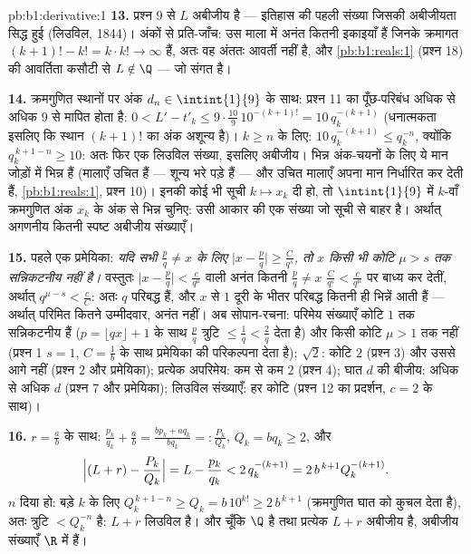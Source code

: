 \begin{solution}{pb:b1:derivative:1}
\textbf{13.} प्रश्न 9 से $L$ अबीजीय है --- इतिहास की पहली संख्या जिसकी
अबीजीयता सिद्ध हुई (लिउविल, 1844)। अंकों से प्रति-जाँच: उस माला में अनंत
कितनी इकाइयाँ हैं जिनके क्रमागत  $(k+1)! - k! = k\cdot k! \to \infty$
हैं, अतः वह अंततः आवर्ती नहीं है, और \cref{pb:b1:reals:1} (प्रश्न 18) की
आवर्तिता कसौटी से $L \notin \Q$ --- जो संगत है।

\textbf{14.} क्रमगुणित स्थानों पर अंक $d_n \in \intint{1}{9}$ के साथ: प्रश्न
11 का पूँछ-परिबंध अधिक से अधिक $9$ से मापित होता है: $0 < L' - t'_k \leq
9\cdot\frac{10}{9}\,10^{-(k+1)!} = 10\,q_k^{-(k+1)}$ (धनात्मकता इसलिए कि
स्थान $(k+1)!$ का अंक अशून्य है)। $k \geq n$ के लिए: $10\,q_k^{-(k+1)} \leq
q_k^{-n}$, क्योंकि $q_k^{\,k+1-n} \geq 10$: अतः फिर एक लिउविल संख्या, इसलिए
अबीजीय। भिन्न अंक-चयनों के लिए ये मान जोड़ों में भिन्न हैं (मालाएँ उचित हैं
--- शून्य भरे पड़े हैं --- और उचित मालाएँ अपना मान निर्धारित कर देती हैं,
\cref{pb:b1:reals:1}, प्रश्न 10)। इनकी कोई भी सूची $k \mapsto x_k$ दी हो, तो
$\intint{1}{9}$ में $k$-वाँ क्रमगुणित अंक $x_k$ के अंक से भिन्न चुनिए: उसी
आकार की एक संख्या जो सूची से बाहर है। अर्थात् अगणनीय कितनी स्पष्ट अबीजीय
संख्याएँ।

\textbf{15.} पहले एक प्रमेयिका: \emph{यदि सभी $\frac pq \neq x$ के लिए
$\bigl|x - \frac pq\bigr| \geq \frac{C}{q^s}$, तो $x$ किसी भी कोटि $\mu > s$
तक सन्निकटनीय नहीं है।} वस्तुतः $\bigl|x - \frac pq\bigr| < \frac{c}{q^\mu}$
वाली अनंत कितनी $\frac pq \neq x$ $\frac{C}{q^s} < \frac{c}{q^\mu}$ पर बाध्य
कर देतीं, अर्थात् $q^{\mu - s} < \frac cC$: अतः $q$ परिबद्ध हैं, और $x$ से
$1$ दूरी के भीतर परिबद्ध कितनी ही भिन्नें आती हैं --- अर्थात् परिमित कितने
उम्मीदवार, अनंत नहीं। अब सोपान-रचना: परिमेय संख्याएँ कोटि $1$ तक सन्निकटनीय
हैं ($p = \lfloor qx\rfloor + 1$ के साथ $\frac pq$ त्रुटि $\leq \frac1q <
\frac2q$ देता है) और किसी कोटि $\mu > 1$ तक नहीं (प्रश्न 1 $s = 1$, $C =
\frac1b$ के साथ प्रमेयिका की परिकल्पना देता है); $\sqrt2$: कोटि $2$ (प्रश्न
3) और उससे आगे नहीं (प्रश्न 2 और प्रमेयिका); प्रत्येक अपरिमेय: कम से कम $2$
(प्रश्न 4); घात $d$ की बीजीय: अधिक से अधिक $d$ (प्रश्न 7 और प्रमेयिका);
लिउविल संख्याएँ: हर कोटि (प्रश्न 12 का प्रदर्शन, $c = 2$ के साथ)।

\textbf{16.} $r = \frac ab$ के साथ: $\frac{p_k}{q_k} + \frac ab = \frac{b
p_k + a q_k}{b q_k} =: \frac{P_k}{Q_k}$, $Q_k = b q_k \geq 2$, और
\[
\Bigl|(L + r) - \frac{P_k}{Q_k}\Bigr| = L - \frac{p_k}{q_k}
< 2\,q_k^{-(k+1)} = 2\,b^{\,k+1} Q_k^{-(k+1)} .
\]
$n$ दिया हो: बड़े $k$ के लिए $Q_k^{\,k+1-n} \geq Q_k = b\,10^{k!} \geq
2\,b^{\,k+1}$ (क्रमगुणित घात को कुचल देता है), अतः त्रुटि $< Q_k^{-n}$ है:
$L + r$ लिउविल है। और चूँकि $\Q$  है तथा प्रत्येक $L + r$ अबीजीय है,
अबीजीय संख्याएँ $\R$ में  हैं।


\end{solution}

